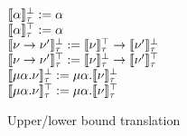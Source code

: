 \begin{figure}[ht]
    \begin{center}
        $\llbracket \alpha \rrbracket_\tau^\bot := \alpha$ \\
        $\llbracket \alpha \rrbracket_\tau^\top := \alpha$ \\
        $\llbracket \nu \to \nu' \rrbracket_\tau^\bot := \llbracket \nu \rrbracket_\tau^\top \to \llbracket \nu' \rrbracket_\tau^\bot$ \\
        $\llbracket \nu \to \nu' \rrbracket_\tau^\top := \llbracket \nu \rrbracket_\tau^\bot \to \llbracket \nu' \rrbracket_\tau^\top$ \\
        $\llbracket \mu\alpha.\nu \rrbracket_\tau^\bot := \mu\alpha.\llbracket \nu \rrbracket_\tau^\bot$ \\
        $\llbracket \mu\alpha.\nu \rrbracket_\tau^\top := \mu\alpha.\llbracket \nu \rrbracket_\tau^\top$ \\
    \end{center}
    \caption{Upper/lower bound translation}
    \label{fig:bound-translation}
\end{figure}

